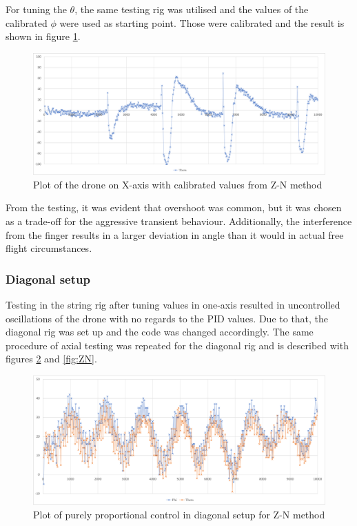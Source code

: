 For tuning the $\theta$, the same testing rig was utilised and the values of the calibrated $\phi$ were used as starting point. Those were calibrated and the result is shown in figure \ref{fig:Theta_ZN}.

\begin{figure}[h!]
    \centering
    \includegraphics[width=\textwidth]{pictures/graphs/ThetaZN_00004.png}
    \caption{Plot of the drone on X-axis with calibrated values from Z-N method}
    \label{fig:Theta_ZN}
\end{figure}

From the testing, it was evident that overshoot was common, but it was chosen as a trade-off for the aggressive transient behaviour. Additionally, the interference from the finger results in a larger deviation in angle than it would in actual free flight circumstances.

\subsubsection{Diagonal setup}

Testing in the string rig after tuning values in one-axis resulted in uncontrolled oscillations of the drone with no regards to the PID values. Due to that, the diagonal rig was set up and the code was changed accordingly.
The same procedure of axial testing was repeated for the diagonal rig and is described with figures \ref{fig:diagonal} and \ref{fig:ZN}.

\begin{figure}[h!]
    \centering
    \includegraphics[width=\textwidth]{pictures/graphs/Diagonal_P0004.png}
    \caption{Plot of purely proportional control in diagonal setup for Z-N method}
    \label{fig:diagonal}
\end{figure}

